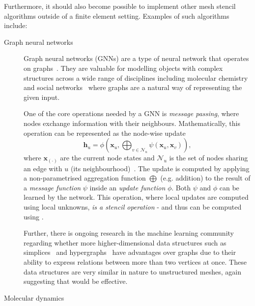 \documentclass[thesis]{subfiles}
\begin{document}
Furthermore, it should also become possible to implement other mesh stencil algorithms outside of a finite element setting.
Examples of such algorithms include:
\begin{description}
  \item[Graph neural networks]
    Graph neural networks (GNNs) are a type of neural network that operates on graphs~\cite{scarselliGraphNeuralNetwork2009}.
    They are valuable for modelling objects with complex structures across a wide range of disciplines including molecular chemistry~\cite{stokesDeepLearningApproach2020} and social networks~\cite{montiFAKENEWSDETECTION2019} where graphs are a natural way of representing the given input.

    One of the core operations needed by a GNN is \emph{message passing}, where nodes exchange information with their neighbours.
    Mathematically, this operation can be represented as the node-wise update
    \begin{equation}
      \mathbf{h}_u = \phi \left( \mathbf{x}_u, \bigoplus_{v \in \mathcal{N}_u} \psi(\mathbf{x}_u, \mathbf{x}_v) \right),
    \end{equation}
    where $\mathbf{x}_{(\cdot)}$ are the current node states and $\mathcal{N}_u$ is the set of nodes sharing an edge with $u$ (its neighbourhood)~\cite{bronsteinGeometricDeepLearning2021}.
    The update is computed by applying a non-parametrised aggregation function $\bigoplus$ (e.g. addition) to the result of a \emph{message function} $\psi$ inside an \emph{update function} $\phi$.
    Both $\psi$ and $\phi$ can be learned by the network.
    This operation, where local updates are computed using local unknowns, \emph{is a stencil operation} - and thus can be computed using .

    Further, there is ongoing research in the machine learning community regarding whether more higher-dimensional data structures such as simplices~\cite{hwangMultiorderSimplexBasedGraph2024} and hypergraphs~\cite{fengHypergraphNeuralNetworks2019} have advantages over graphs due to their ability to express relations between more than two vertices at once.
    These data structures are very similar in nature to unstructured meshes, again suggesting that  would be effective.
  \item[Molecular dynamics]


\end{description}
\end{document}
